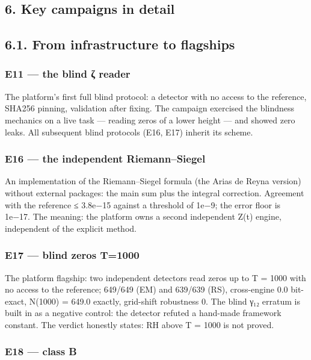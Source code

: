 \documentclass[11pt,a4paper]{article}
\begin{document}
\subsection{6. Key campaigns in detail}

\subsection{6.1. From infrastructure to flagships}

\subsubsection{E11 — the blind ζ reader}

The platform's first full blind protocol: a detector with no access to the reference, SHA256 pinning, validation after fixing. The campaign exercised the blindness mechanics on a live task — reading zeros of a lower height — and showed zero leaks. All subsequent blind protocols (E16, E17) inherit its scheme.

\subsubsection{E16 — the independent Riemann–Siegel}

An implementation of the Riemann–Siegel formula (the Arias de Reyna version) without external packages: the main sum plus the integral correction. Agreement with the reference ≤ 3.8e−15 against a threshold of 1e−9; the error floor is 1e−17. The meaning: the platform owns a second independent Z(t) engine, independent of the explicit method.

\subsubsection{E17 — blind zeros T=1000}

The platform flagship: two independent detectors read zeros up to T = 1000 with no access to the reference; 649/649 (EM) and 639/639 (RS), cross-engine 0.0 bit-exact, N(1000) = 649.0 exactly, grid-shift robustness 0. The blind γ₁₂ erratum is built in as a negative control: the detector refuted a hand-made framework constant. The verdict honestly states: RH above T = 1000 is not proved.

\subsubsection{E18 — class B}
\end{document}
